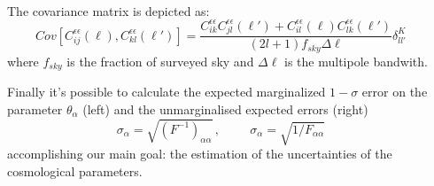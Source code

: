 \begin{frame}[t]
\begin{columns}[t]

\begin{column}{.03\textwidth}\end{column} %

\begin{column}{.465\textwidth} %
\vspace{10}\\

The covariance matrix is depicted as: $$Cov[C_{ij}^{\epsilon\epsilon}(\ell), C_{kl}^{\epsilon\epsilon}(\ell')]=\frac{C_{ik}^{\epsilon\epsilon} C_{jl}^{\epsilon\epsilon}(\ell') + C_{il}^{\epsilon\epsilon}(\ell)C_{lk}^{\epsilon\epsilon}(\ell')}{(2l+1)f_{sky}\Delta \ell}\delta_{ll'}^K$$ where $f_{sky}$ is the fraction of surveyed sky and $\Delta \ell $ is the multipole bandwith.


 Finally it's possible to calculate the expected marginalized $1-\sigma$ error on the parameter $\theta_\alpha$ (left) and the unmarginalised expected errors (right)
$$\sigma_\alpha = \sqrt{(F^{-1})_{\alpha\alpha}}\,, \hspace{1cm} \sigma_\alpha =  \sqrt{1/F_{\alpha\alpha}}$$ accomplishing our main goal: the estimation of the uncertainties of the cosmological parameters.
%


\end{column}
\end{columns}
\end{frame}
